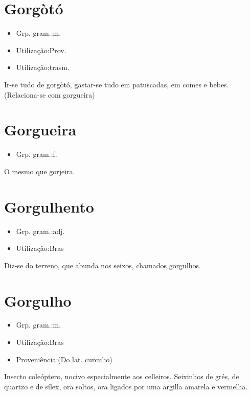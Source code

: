 \section{Gorgòtó}
\begin{itemize}
\item {Grp. gram.:m.}
\end{itemize}
\begin{itemize}
\item {Utilização:Prov.}
\end{itemize}
\begin{itemize}
\item {Utilização:trasm.}
\end{itemize}
\textunderscore Ir-se tudo de gorgòtó\textunderscore , gastar-se tudo em patuscadas, em comes e bebes.
(Relaciona-se com \textunderscore gorgueira\textunderscore )
\section{Gorgueira}
\begin{itemize}
\item {Grp. gram.:f.}
\end{itemize}
O mesmo que \textunderscore gorjeira\textunderscore .
\section{Gorgulhento}
\begin{itemize}
\item {Grp. gram.:adj.}
\end{itemize}
\begin{itemize}
\item {Utilização:Bras}
\end{itemize}
Diz-se do terreno, que abunda nos seixos, chamados gorgulhos.
\section{Gorgulho}
\begin{itemize}
\item {Grp. gram.:m.}
\end{itemize}
\begin{itemize}
\item {Utilização:Bras}
\end{itemize}
\begin{itemize}
\item {Proveniência:(Do lat. \textunderscore curculio\textunderscore )}
\end{itemize}
Insecto coleóptero, nocivo especialmente aos celleiros.
Seixinhos de grés, de quartzo e de sílex, ora soltos, ora ligados por uma argilla amarela e vermelha.
